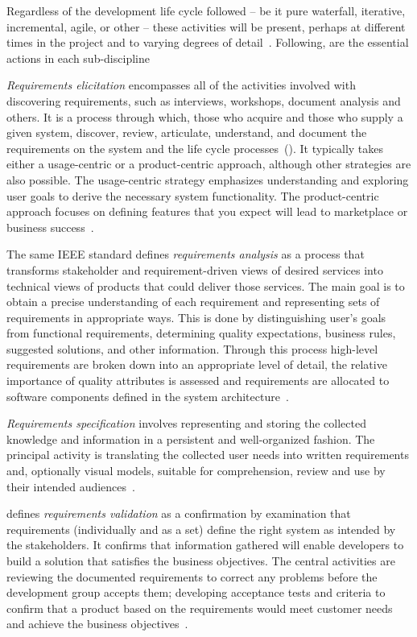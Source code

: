 \documentclass[dissertation,final]{softeng}
\begin{document}
Regardless of the development life cycle followed -- be it pure waterfall, iterative, incremental, agile, or other -- these activities will be present, perhaps at different times in the project and to varying degrees of detail~\citep{Wiegers2013}. Following, are the essential actions in each sub-discipline

\emph{Requirements elicitation} encompasses all of the activities involved with discovering requirements, such as interviews, workshops, document analysis and others. It is a process through which, those who acquire and those who supply a given system, discover, review, articulate, understand, and document the requirements on the system and the life cycle processes~(). It typically takes either a usage-centric or a product-centric approach, although other strategies are also possible. The usage-centric strategy emphasizes understanding and exploring user goals to derive the necessary system functionality. The product-centric approach focuses on defining features that you expect will lead to marketplace or business success~\citep{Wiegers2013}.

The same IEEE standard defines \emph{requirements analysis} as a process that transforms stakeholder and requirement-driven views of desired services into technical views of products that could deliver those services. The main goal is to obtain a precise understanding of each requirement and representing sets of requirements in appropriate ways. This is done by distinguishing user's goals from functional requirements, determining quality expectations, business rules, suggested solutions, and other information. Through this process high-level requirements are broken down into an appropriate level of detail, the relative importance of quality attributes is assessed and requirements are allocated to software components defined in the system architecture~\citep{Wiegers2013}.

\emph{Requirements specification} involves representing and storing the collected knowledge and information in a persistent and well-organized fashion. The principal activity is translating the collected user needs into written requirements and, optionally visual models, suitable for comprehension, review and use by their intended audiences~\citep{Wiegers2013}.

 defines \emph{requirements validation} as a confirmation by examination that requirements (individually and as a set) define the right system as intended by the stakeholders. It confirms that information gathered will enable developers to build a solution that satisfies the business objectives. The central activities are reviewing the documented requirements to correct any problems before the development group accepts them; developing acceptance tests and criteria to confirm that a product based on the requirements would meet customer needs and achieve the business objectives~\citep{Wiegers2013}.
\end{document}

